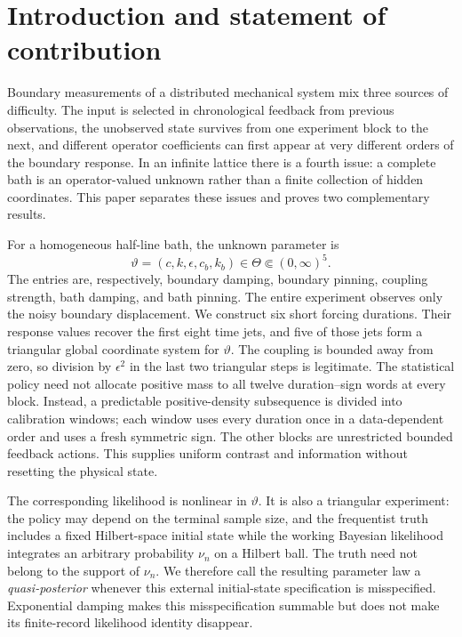 
\section{Introduction and statement of contribution}
\label{sec:introduction}

Boundary measurements of a distributed mechanical system mix three sources of difficulty.  The input is selected in chronological feedback from previous observations, the unobserved state survives from one experiment block to the next, and different operator coefficients can first appear at very different orders of the boundary response.  In an infinite lattice there is a fourth issue: a complete bath is an operator-valued unknown rather than a finite collection of hidden coordinates.  This paper separates these issues and proves two complementary results.

For a homogeneous half-line bath, the unknown parameter is
\[
 \vartheta=(c,k,\epsilon,c_b,k_b)\in\Theta\Subset(0,\infty)^5.
\]
The entries are, respectively, boundary damping, boundary pinning, coupling strength, bath damping, and bath pinning.  The entire experiment observes only the noisy boundary displacement.  We construct six short forcing durations.  Their response values recover the first eight time jets, and five of those jets form a triangular global coordinate system for \(\vartheta\).  The coupling is bounded away from zero, so division by \(\epsilon^2\) in the last two triangular steps is legitimate.  The statistical policy need not allocate positive mass to all twelve duration--sign words at every block.  Instead, a predictable positive-density subsequence is divided into calibration windows; each window uses every duration once in a data-dependent order and uses a fresh symmetric sign.  The other blocks are unrestricted bounded feedback actions.  This supplies uniform contrast and information without resetting the physical state.

The corresponding likelihood is nonlinear in \(\vartheta\).  It is also a triangular experiment: the policy may depend on the terminal sample size, and the frequentist truth includes a fixed Hilbert-space initial state while the working Bayesian likelihood integrates an arbitrary probability \(\nu_n\) on a Hilbert ball.  The truth need not belong to the support of \(\nu_n\).  We therefore call the resulting parameter law a \emph{quasi-posterior} whenever this external initial-state specification is misspecified.  Exponential damping makes this misspecification summable but does not make its finite-record likelihood identity disappear.


